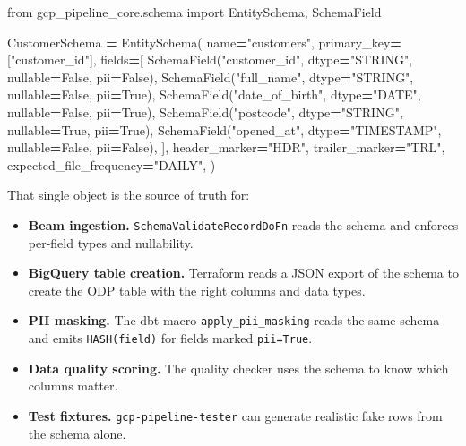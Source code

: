 \documentclass[
  11pt,
  british,
  oneside]{book}
\newenvironment{Shaded}{\begin{snugshade}}{\end{snugshade}}
\newcommand{\ImportTok}[1]{#1}
\newcommand{\NormalTok}[1]{#1}
\newcommand{\OperatorTok}[1]{\textcolor[rgb]{0.81,0.36,0.00}{\textbf{#1}}}
\newcommand{\StringTok}[1]{\textcolor[rgb]{0.31,0.60,0.02}{#1}}
\newcommand{\VariableTok}[1]{\textcolor[rgb]{0.00,0.00,0.00}{#1}}
\providecommand{\tightlist}{%
  \setlength{\itemsep}{0pt}\setlength{\parskip}{0pt}}
\begin{document}
\begin{Shaded}
\begin{Highlighting}[]
\ImportTok{from}\NormalTok{ gcp\_pipeline\_core.schema }\ImportTok{import}\NormalTok{ EntitySchema, SchemaField}

\NormalTok{CustomerSchema }\OperatorTok{=}\NormalTok{ EntitySchema(}
\NormalTok{    name}\OperatorTok{=}\StringTok{"customers"}\NormalTok{,}
\NormalTok{    primary\_key}\OperatorTok{=}\NormalTok{[}\StringTok{"customer\_id"}\NormalTok{],}
\NormalTok{    fields}\OperatorTok{=}\NormalTok{[}
\NormalTok{        SchemaField(}\StringTok{"customer\_id"}\NormalTok{,   dtype}\OperatorTok{=}\StringTok{"STRING"}\NormalTok{,  nullable}\OperatorTok{=}\VariableTok{False}\NormalTok{, pii}\OperatorTok{=}\VariableTok{False}\NormalTok{),}
\NormalTok{        SchemaField(}\StringTok{"full\_name"}\NormalTok{,     dtype}\OperatorTok{=}\StringTok{"STRING"}\NormalTok{,  nullable}\OperatorTok{=}\VariableTok{False}\NormalTok{, pii}\OperatorTok{=}\VariableTok{True}\NormalTok{),}
\NormalTok{        SchemaField(}\StringTok{"date\_of\_birth"}\NormalTok{, dtype}\OperatorTok{=}\StringTok{"DATE"}\NormalTok{,    nullable}\OperatorTok{=}\VariableTok{False}\NormalTok{, pii}\OperatorTok{=}\VariableTok{True}\NormalTok{),}
\NormalTok{        SchemaField(}\StringTok{"postcode"}\NormalTok{,      dtype}\OperatorTok{=}\StringTok{"STRING"}\NormalTok{,  nullable}\OperatorTok{=}\VariableTok{True}\NormalTok{,  pii}\OperatorTok{=}\VariableTok{True}\NormalTok{),}
\NormalTok{        SchemaField(}\StringTok{"opened\_at"}\NormalTok{,     dtype}\OperatorTok{=}\StringTok{"TIMESTAMP"}\NormalTok{, nullable}\OperatorTok{=}\VariableTok{False}\NormalTok{, pii}\OperatorTok{=}\VariableTok{False}\NormalTok{),}
\NormalTok{    ],}
\NormalTok{    header\_marker}\OperatorTok{=}\StringTok{"HDR"}\NormalTok{,}
\NormalTok{    trailer\_marker}\OperatorTok{=}\StringTok{"TRL"}\NormalTok{,}
\NormalTok{    expected\_file\_frequency}\OperatorTok{=}\StringTok{"DAILY"}\NormalTok{,}
\NormalTok{)}
\end{Highlighting}
\end{Shaded}

That single object is the source of truth for:

\begin{itemize}
\tightlist
\item
  \textbf{Beam ingestion.} \texttt{SchemaValidateRecordDoFn} reads the
  schema and enforces per-field types and nullability.
\item
  \textbf{BigQuery table creation.} Terraform reads a JSON export of the
  schema to create the ODP table with the right columns and data types.
\item
  \textbf{PII masking.} The dbt macro \texttt{apply\_pii\_masking} reads
  the same schema and emits \texttt{HASH(field)} for fields marked
  \texttt{pii=True}.
\item
  \textbf{Data quality scoring.} The quality checker uses the schema to
  know which columns matter.
\item
  \textbf{Test fixtures.} \texttt{gcp-pipeline-tester} can generate
  realistic fake rows from the schema alone.
\end{itemize}
\end{document}

